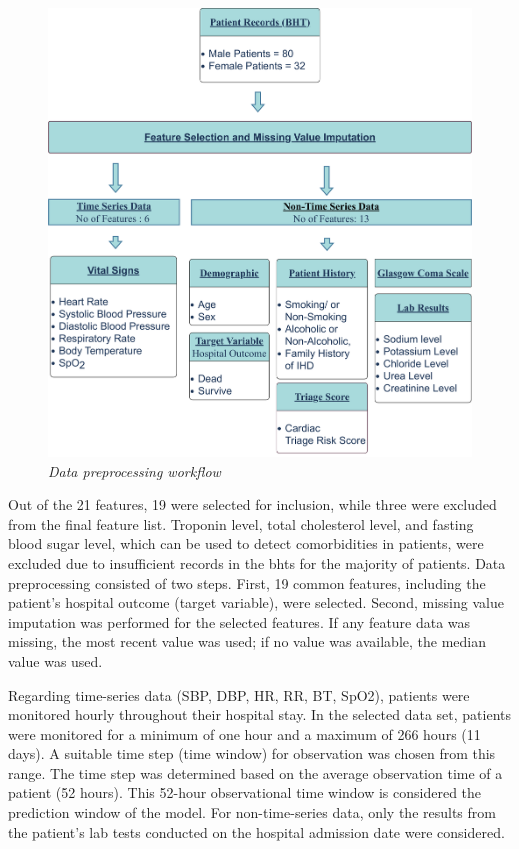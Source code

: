 \documentclass[journal,article,submit,pdftex,moreauthors]{Definitions/mdpi}
\begin{document}
\begin{figure}[hbt!]
    \centering
    \includegraphics[width=0.75\linewidth]{images/dataPreprocessing.pdf}
    \caption{\textit{Data preprocessing workflow}}
    \label{fig:figure3}
    \vspace{-10pt}
\end{figure}

Out of the 21 features, 19 were selected for inclusion, while three were excluded from the final feature list. Troponin level, total cholesterol level, and fasting blood sugar level, which can be used to detect comorbidities in patients, were excluded due to insufficient records in the \glspl{bht} for the majority of patients. Data preprocessing consisted of two steps. First, 19 common features, including the patient's hospital outcome (target variable), were selected. Second, missing value imputation was performed for the selected features. If any feature data was missing, the most recent value was used; if no value was available, the median value was used.

Regarding time-series data (SBP, DBP, HR, RR, BT, SpO2), patients were monitored hourly throughout their hospital stay. In the selected data set, patients were monitored for a minimum of one hour and a maximum of 266 hours (11 days). A suitable time step (time window) for observation was chosen from this range. The time step was determined based on the average observation time of a patient (52 hours). This 52-hour observational time window is considered the prediction window of the model. For non-time-series data, only the results from the patient's lab tests conducted on the hospital admission date were considered.
\end{document}
